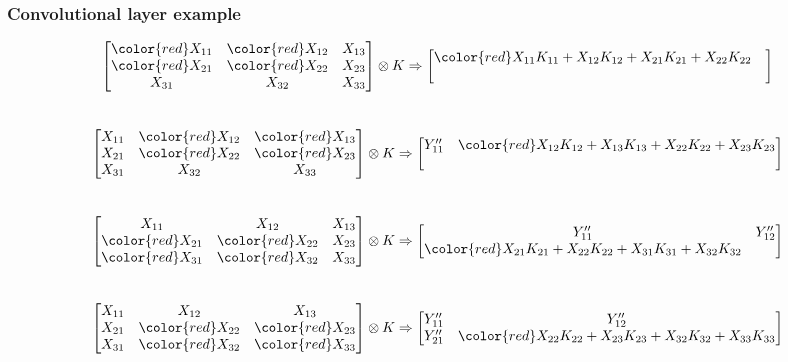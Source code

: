 \documentclass{beamer}
\begin{document}
\begin{frame}
    \frametitle{Convolutional layer example}

    \begin{figure}
        \centering
        $$\begin{bmatrix}
            \color{red} X_{11} & \color{red} X_{12} & X_{13} \\
            \color{red} X_{21} & \color{red} X_{22} & X_{23} \\
            X_{31} & X_{32} & X_{33} 
        \end{bmatrix} \otimes K \Rightarrow \begin{bmatrix}
            \color{red} X_{11} K_{11} + X_{12} K_{12} + X_{21} K_{21} + X_{22} K_{22} & \\
             &
        \end{bmatrix}$$\\
        \pause
        $$\begin{bmatrix}
            X_{11} & \color{red} X_{12} & \color{red} X_{13} \\
            X_{21} & \color{red} X_{22} & \color{red} X_{23} \\
            X_{31} & X_{32} & X_{33} 
        \end{bmatrix} \otimes K \Rightarrow \begin{bmatrix}
             Y''_{11} &\color{red} X_{12} K_{12} + X_{13} K_{13} + X_{22} K_{22} + X_{23} K_{23} \\
             &
        \end{bmatrix}$$\\
        \pause
        $$\begin{bmatrix}
            X_{11} & X_{12} & X_{13} \\
            \color{red} X_{21} & \color{red} X_{22} & X_{23} \\
            \color{red} X_{31} & \color{red} X_{32} & X_{33}
        \end{bmatrix} \otimes K \Rightarrow \begin{bmatrix}
            Y''_{11} & Y''_{12} \\
            \color{red} X_{21} K_{21} + X_{22} K_{22} + X_{31} K_{31} + X_{32} K_{32} & 
        \end{bmatrix}$$\\
        \pause
        $$\begin{bmatrix}
            X_{11} & X_{12} & X_{13} \\
            X_{21} & \color{red} X_{22} & \color{red} X_{23} \\
            X_{31} & \color{red} X_{32} & \color{red} X_{33}
        \end{bmatrix} \otimes K \Rightarrow \begin{bmatrix}
             Y''_{11} & Y''_{12} \\
             Y''_{21} & \color{red} X_{22} K_{22} + X_{23} K_{23} + X_{32} K_{32} + X_{33} K_{33}
        \end{bmatrix}$$\\
        \label{fig:conv_operation}
    \end{figure}
\end{frame}
\end{document}
